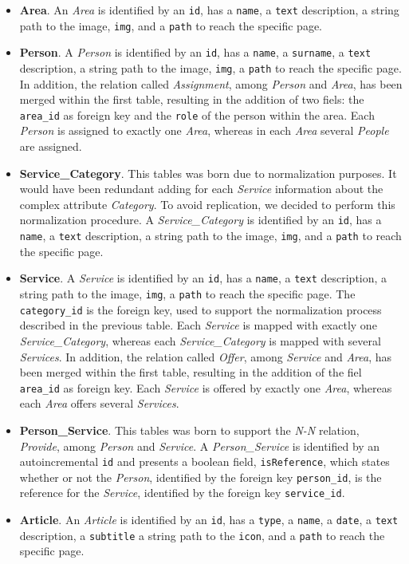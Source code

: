 \documentclass[12pt]{report}
\begin{document}
\begin{itemize}
	\item \textbf{Area}. An \emph{Area} is identified by an \texttt{id}, 
	has a \texttt{name}, a \texttt{text} description, a string path to the image, 
	\texttt{img}, and a \texttt{path} to reach the specific page. 
	\item \textbf{Person}. A \emph{Person} is identified by an \texttt{id}, 
	has a \texttt{name}, a \texttt{surname}, a \texttt{text} description, a 
	string path to the image, \texttt{img}, a \texttt{path} to reach the specific page.
	In addition, the relation called \emph{Assignment}, among \emph{Person} and \emph{Area}, has
	been merged within the first table, resulting in the addition of two fiels: the 
	\texttt{area\_id} as foreign key and the \texttt{role} of the person within the area.
	Each \emph{Person} is assigned to exactly one \emph{Area}, whereas in each \emph{Area} several
	\emph{People} are assigned.
	\item \textbf{Service\_Category}. This tables was born due to normalization purposes. 
	It would have been redundant adding for each \emph{Service} information about the complex 
	attribute \emph{Category}. To avoid replication, we decided to perform this normalization 
	procedure. A \emph{Service\_Category} is identified by an \texttt{id}, 
	has a \texttt{name}, a \texttt{text} description, a string path to the image, 
	\texttt{img}, and a \texttt{path} to reach the specific page. 
	\item \textbf{Service}. A \emph{Service} is identified by an \texttt{id}, 
	has a \texttt{name}, a \texttt{text} description, a string path to the image, \texttt{img}, 
	a \texttt{path} to reach the specific page.
	The \texttt{category\_id} is the foreign key, used to support the normalization process 
	described in the previous table. 
	Each \emph{Service} is mapped with exactly one \emph{Service\_Category}, whereas each 
	\emph{Service\_Category} is mapped with several \emph{Services}.
	In addition, the relation called \emph{Offer}, among 
	\emph{Service} and \emph{Area}, has	been merged within the first table, resulting in 
	the addition of the fiel \texttt{area\_id} as foreign key.
	Each \emph{Service} is offered by exactly one \emph{Area}, whereas each \emph{Area} offers 
	several \emph{Services}.
	\item \textbf{Person\_Service}. This tables was born to support the \emph{N-N} relation, 
	\emph{Provide}, among \emph{Person} and \emph{Service}. A \emph{Person\_Service} is 
	identified by an autoincremental \texttt{id} and presents a boolean field, \texttt{isReference}, 
	which states whether or not the \emph{Person}, identified by the foreign key \texttt{person\_id}, 
	is the reference for the \emph{Service}, identified by the foreign key \texttt{service\_id}.
	\item \textbf{Article}. An \emph{Article} is identified by an \texttt{id}, has a 
	\texttt{type}, a \texttt{name}, a \texttt{date}, a \texttt{text} description, a \texttt{subtitle} 
	a string path to the \texttt{icon}, and a \texttt{path} to reach the specific page. 
\end{itemize}
\end{document}
